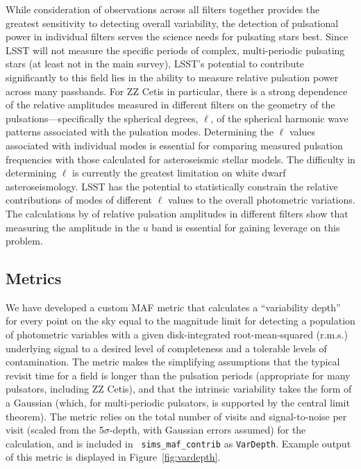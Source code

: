 While consideration of observations across all filters together provides
the greatest sensitivity to detecting overall variability, the detection
of pulsational power in individual filters serves the science needs for
pulsating stars best.  Since LSST will not measure the specific periods
of complex, multi-periodic pulsating stars (at least not in the main
survey), LSST's potential to contribute significantly to this field lies
in the ability to measure relative pulsation power across many
passbands.  For ZZ Cetis in particular, there is a strong dependence of
the relative amplitudes measured in different filters on the geometry of
the pulsations---specifically the spherical degrees, $\ell$, of the
spherical harmonic wave patterns associated with the pulsation modes.
Determining the $\ell$ values associated with individual modes is
essential for comparing measured pulsation frequencies with those
calculated for asteroseismic stellar models.  The difficulty in
determining $\ell$ is currently the greatest limitation on white dwarf
asteroseismology. LSST has the potential to statistically constrain the
relative contributions of modes of different $\ell$ values to the
overall photometric variations.  The calculations by
\citet{1995ApJS...96..545B} of relative pulsation amplitudes in
different filters show that measuring the amplitude in the $u$ band is
essential for gaining leverage on this problem.


\subsection{Metrics}
\label{sec:\secname:metrics}

We have developed a custom MAF metric that calculates a ``variability
depth'' for every point on the sky equal to the magnitude limit for
detecting a population of photometric variables with a given
disk-integrated root-mean-squared (r.m.s.) underlying signal to a
desired level of completeness and a tolerable levels of contamination.
The metric makes the simplifying
assumptions that the typical revisit time for a field is longer than the
pulsation periods (appropriate for many pulsators, including ZZ Cetis),
and that the intrinsic variability takes the form of a Gaussian (which,
for multi-periodic pulsators, is supported by the central limit
theorem).  The metric relies on the total number of visits and
signal-to-noise per visit (scaled from the 5$\sigma$-depth, with
Gaussian errors assumed) for the calculation, and is included in {\tt
sims\_maf\_contrib} as {\tt VarDepth}.  Example output of this metric
is displayed in Figure~\ref{fig:vardepth}.

